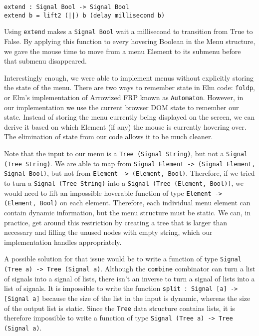 \documentclass{article}
\begin{document}
\begin{verbatim}
extend : Signal Bool -> Signal Bool
extend b = lift2 (||) b (delay millisecond b)
\end{verbatim}

Using \texttt{extend} makes a \texttt{Signal Bool} wait a millisecond to
transition from True to False. By applying this function to every
hovering Boolean in the Menu structure, we gave the mouse time to move
from a menu Element to its submenu before that submenu disappeared.

Interestingly enough, we were able to implement menus without explicitly
storing the state of the menu. There are two ways to remember state in
Elm code: \texttt{foldp}, or Elm's implementation of Arrowized FRP known
as \texttt{Automaton}. However, in our implementation we use the current
browser DOM state to remember our state. Instead of storing the menu
currently being displayed on the screen, we can derive it based on which
Element (if any) the mouse is currently hovering over. The elimination
of state from our code allows it to be much cleaner.

Note that the input to our menu is a \texttt{Tree (Signal String)}, but
not a \texttt{Signal (Tree String)}. We are able to map from
\texttt{Signal Element -\textgreater{} (Signal Element, Signal Bool)},
but not from \texttt{Element -\textgreater{} (Element, Bool)}.
Therefore, if we tried to turn a \texttt{Signal (Tree String)} into a
\texttt{Signal (Tree (Element, Bool))}, we would need to lift an
impossible hoverable function of type
\texttt{Element -\textgreater{} (Element, Bool)} on each element.
Therefore, each individual menu element can contain dynamic information,
but the menu structure must be static. We can, in practice, get around
this restriction by creating a tree that is larger than necessary and
filling the unused nodes with empty string, which our implementation
handles appropriately.

A possible solution for that issue would be to write a function of type
\texttt{Signal (Tree a) -\textgreater{} Tree (Signal a)}. Although the
\texttt{combine} combinator can turn a list of signals into a signal of
lists, there isn't an inverse to turn a signal of lists into a list of
signals. It is impossible to write the function
\texttt{split : Signal {[}a{]} -\textgreater{} {[}Signal a{]}} because
the size of the list in the input is dynamic, whereas the size of the
output list is static. Since the \texttt{Tree} data structure contains
lists, it is therefore impossible to write a function of type
\texttt{Signal (Tree a) -\textgreater{} Tree (Signal a)}.
\end{document}

